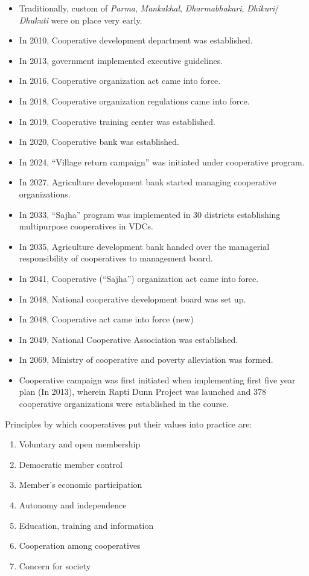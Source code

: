 \documentclass[
  openany]{book}
\providecommand{\tightlist}{%
  \setlength{\itemsep}{0pt}\setlength{\parskip}{0pt}}
\begin{document}
\begin{itemize}
\item
  Traditionally, custom of \emph{Parma}, \emph{Mankakhal}, \emph{Dharmabhakari}, \emph{Dhikuri}/ \emph{Dhukuti} were on place very early.
\item
  In 2010, Cooperative development department was established.
\item
  In 2013, government implemented executive guidelines.
\item
  In 2016, Cooperative organization act came into force.
\item
  In 2018, Cooperative organization regulations came into force.
\item
  In 2019, Cooperative training center was established.
\item
  In 2020, Cooperative bank was established.
\item
  In 2024, ``Village return campaign'' was initiated under cooperative program.
\item
  In 2027, Agriculture development bank started managing cooperative organizations.
\item
  In 2033, ``Sajha'' program was implemented in 30 districts establishing multipurpose cooperatives in VDCs.
\item
  In 2035, Agriculture development bank handed over the managerial responsibility of cooperatives to management board.
\item
  In 2041, Cooperative (``Sajha'') organization act came into force.
\item
  In 2048, National cooperative development board was set up.
\item
  In 2048, Cooperative act came into force (new)
\item
  In 2049, National Cooperative Association was established.
\item
  In 2069, Ministry of cooperative and poverty alleviation was formed.
\item
  Cooperative campaign was first initiated when implementing first five year plan (In 2013), wherein Rapti Dunn Project was launched and 378 cooperative organizations were established in the course.
\end{itemize}

Principles by which cooperatives put their values into practice are:

\begin{enumerate}
\def\labelenumi{\arabic{enumi}.}
\tightlist
\item
  Voluntary and open membership
\item
  Democratic member control
\item
  Member's economic participation
\item
  Autonomy and independence
\item
  Education, training and information
\item
  Cooperation among cooperatives
\item
  Concern for society
\end{enumerate}
\end{document}
